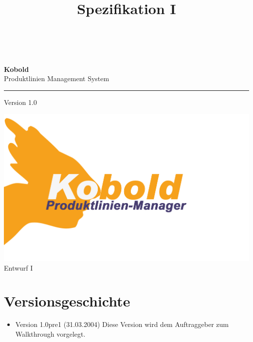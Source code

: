 \documentclass[a4paper,titlepage,12pt,ngerman]{scrbook}
\title {\huge \product\\[0.5cm]\large Spezifikation I \\[0.5cm] \version
  \\[1cm] \Large \company}
\newcommand\version{Version 1.0\xspace}
\begin{document}

\begin{titlepage}
\renewcommand{\thefootnote}{\fnsymbol{footnote}}
{\Huge
\raggedright
\textbf{\bf Kobold} \\
\huge Produktlinien Management System
\rule{\textwidth}{0.75pt}
\par
}
\begin{flushleft}
\normalsize
\version
\end{flushleft}


\vfill
\includegraphics[width=15cm]{../common/logo-color.png}
\vfill
{\parindent=0cm
\Huge Entwurf I
}


\setcounter{footnote}{0}
\end{titlepage}


\section*{Versionsgeschichte}

\begin{itemize}

\item Version 1.0pre1 (31.03.2004)
    Diese Version wird dem Auftraggeber zum Walkthrough vorgelegt.

\end{itemize}

\tableofcontents





\appendix

\end{document}
